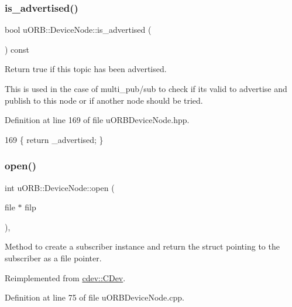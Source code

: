 \subsubsection{\texorpdfstring{is\+\_\+advertised()}{is\_advertised()}}
{\footnotesize\ttfamily bool u\+O\+R\+B\+::\+Device\+Node\+::is\+\_\+advertised (\begin{DoxyParamCaption}{ }\end{DoxyParamCaption}) const\hspace{0.3cm}{\ttfamily [inline]}}

Return true if this topic has been advertised.

This is used in the case of multi\+\_\+pub/sub to check if it\textquotesingle{}s valid to advertise and publish to this node or if another node should be tried. 

Definition at line 169 of file u\+O\+R\+B\+Device\+Node.\+hpp.


\begin{DoxyCode}
169 \{ \textcolor{keywordflow}{return} \_advertised; \}
\end{DoxyCode}
\mbox{\label{classuORB_1_1DeviceNode_ae7f3782c9876a17b4aa6949440655f1f}} 
\subsubsection{\texorpdfstring{open()}{open()}}
{\footnotesize\ttfamily int u\+O\+R\+B\+::\+Device\+Node\+::open (\begin{DoxyParamCaption}\item[{file $\ast$}]{filp }\end{DoxyParamCaption})\hspace{0.3cm}{\ttfamily [override]}, {\ttfamily [virtual]}}

Method to create a subscriber instance and return the struct pointing to the subscriber as a file pointer. 

Reimplemented from \hyperlink{classcdev_1_1CDev_ac04b7ee91373c86545107e3467ba54c1}{cdev\+::\+C\+Dev}.



Definition at line 75 of file u\+O\+R\+B\+Device\+Node.\+cpp.


